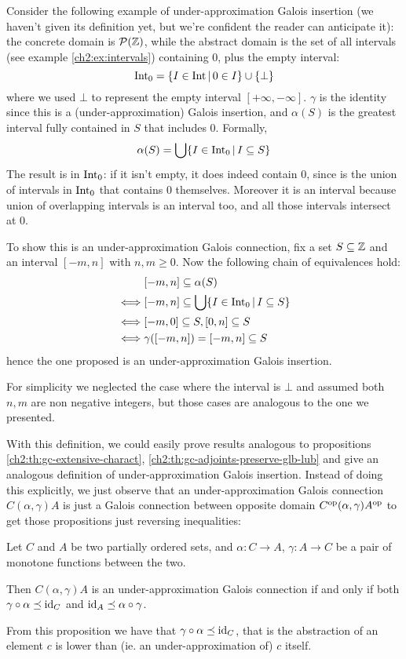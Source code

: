 \begin{example}\label{ch2:ex:intervals-0}
	Consider the following example of under-approximation Galois insertion (we haven't given its definition yet, but we're confident the reader can anticipate it): the concrete domain is $\mathcal{P}(\mathbb{Z})$, while the abstract domain is the set of all intervals (see example \ref{ch2:ex:intervals}) containing $0$, plus the empty interval:
	\[
	\text{Int}_0 = \{ I \in \text{Int} \,\vert\, 0 \in I \} \cup \{ \bot \}
	\]
	where we used $\bot$ to represent the empty interval $[+\infty, -\infty]$.
	$\gamma$ is the identity since this is a (under-approximation) Galois insertion, and $\alpha(S)$ is the greatest interval fully contained in $S$ that includes $0$. Formally,
	\begin{align*}
		\alpha(S) = \bigcup \{ I \in \text{Int}_0 \,\vert\, I \subseteq S \}
	\end{align*}
	The result is in $\text{Int}_0$: if it isn't empty, it does indeed contain $0$, since is the union of intervals in $\text{Int}_0$ that contains $0$ themselves. Moreover it is an interval because union of overlapping intervals is an interval too, and all those intervals intersect at $0$.

	To show this is an under-approximation Galois connection, fix a set $S \subseteq \mathbb{Z}$ and an interval $[-m, n]$ with $n, m \ge 0$.
	Now the following chain of equivalences hold:
	\begin{align*}
		&[-m, n] \subseteq \alpha(S) \\
		\iff &[-m, n] \subseteq \bigcup \{ I \in \text{Int}_0 \,\vert\, I \subseteq S \} \\
		\iff &[-m, 0] \subseteq S, [0, n] \subseteq S \\
		\iff &\gamma([-m, n]) = [-m, n] \subseteq S
	\end{align*}
	hence the one proposed is an under-approximation Galois insertion.

	For simplicity we neglected the case where the interval is $\bot$ and assumed both $n, m$ are non negative integers, but those cases are analogous to the one we presented.
\end{example}
With this definition, we could easily prove results analogous to propositions \ref{ch2:th:gc-extensive-charact}, \ref{ch2:th:gc-adjoints-preserve-glb-lub} and give an analogous definition of under-approximation Galois insertion.
Instead of doing this explicitly, we just observe that an under-approximation Galois connection $C (\alpha, \gamma) A$ is just a Galois connection between opposite domain $C^{\text{op}} (\alpha, \gamma) A^{\text{op}}$ to get those propositions just reversing inequalities:
\begin{prop}\label{ch2:th:under-gc-extensive-charact}
	Let $C$ and $A$ be two partially ordered sets, and $\alpha : C \rightarrow A$, $\gamma : A \rightarrow C$ be a pair of monotone functions between the two.

	Then $C (\alpha, \gamma) A$ is an under-approximation Galois connection if and only if both $\gamma \circ \alpha \preceq \text{id}_C$ and $\text{id}_A \preceq \alpha \circ \gamma$.
\end{prop}
From this proposition we have that $\gamma \circ \alpha \preceq \text{id}_C$, that is the abstraction of an element $c$ is lower than (ie. an under-approximation of) $c$ itself.

